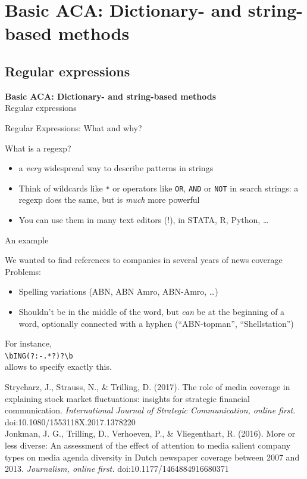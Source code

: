 \documentclass{beamer}
\begin{document}
\section[Basic ACA]{Basic ACA: Dictionary- and string-based methods}

\subsection{Regular expressions}
\begin{frame}
	\textbf{Basic ACA: Dictionary- and string-based methods}\\
	Regular expressions
\end{frame}


\begin{frame}{Regular Expressions: What and why?}
\begin{block}{What is a regexp?}
\begin{itemize}
\item<1-> a \emph{very} widespread way to describe patterns in strings
\item<2-> Think of wildcards like {\tt{*}} or operators like {\tt{OR}}, {\tt{AND}} or {\tt{NOT}} in search strings: a regexp does the same, but is \emph{much} more powerful
\item<3-> You can use them in many text editors (!), in STATA, R, Python, \ldots 
\end{itemize}
\end{block}
\end{frame}

\begin{frame}{An example}
\begin{block}{We wanted to find references to companies in several years of news coverage}
Problems: 
\begin{itemize}
\item Spelling variations (ABN, ABN Amro, ABN-Amro, \ldots)
\item Shouldn't be in the middle of the word, but \emph{can} be at the beginning of a word, optionally connected with a hyphen (``ABN-topman'', ``Shellstation'')
\end{itemize}
For instance, \\
{\texttt{\textbackslash bING(?:-.*?)?\textbackslash b}} \\
allows to specify exactly this.
\end{block}
{\tiny{Strycharz, J., Strauss, N., \& Trilling, D. (2017). The role of media coverage in explaining stock market fluctuations: insights for strategic financial communication. \textit{International Journal of Strategic Communication, online first}. doi:10.1080/1553118X.2017.1378220 \\
Jonkman, J. G., Trilling, D., Verhoeven, P., \& Vliegenthart, R. (2016). More or less diverse: An assessment of the effect of attention to media salient company types on media agenda diversity in Dutch newspaper coverage between 2007 and 2013.\textit{ Journalism, online first.} doi:10.1177/1464884916680371\\ } }
\end{frame}
\end{document}
